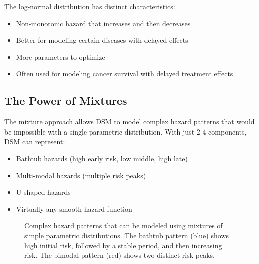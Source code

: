 The log-normal distribution has distinct characteristics:
\begin{itemize}
    \item Non-monotonic hazard that increases and then decreases
    \item Better for modeling certain diseases with delayed effects
    \item More parameters to optimize
    \item Often used for modeling cancer survival with delayed treatment effects
\end{itemize}

\subsection{The Power of Mixtures}

The mixture approach allows DSM to model complex hazard patterns that would be impossible with a single parametric distribution. With just 2-4 components, DSM can represent:

\begin{itemize}
    \item Bathtub hazards (high early risk, low middle, high late)
    \item Multi-modal hazards (multiple risk peaks)
    \item U-shaped hazards
    \item Virtually any smooth hazard function
\end{itemize}

\begin{figure}[htbp]
    \centering
    \caption{Complex hazard patterns that can be modeled using mixtures of simple parametric distributions. The bathtub pattern (blue) shows high initial risk, followed by a stable period, and then increasing risk. The bimodal pattern (red) shows two distinct risk peaks.}
    \label{fig:complex-hazards}
\end{figure}

